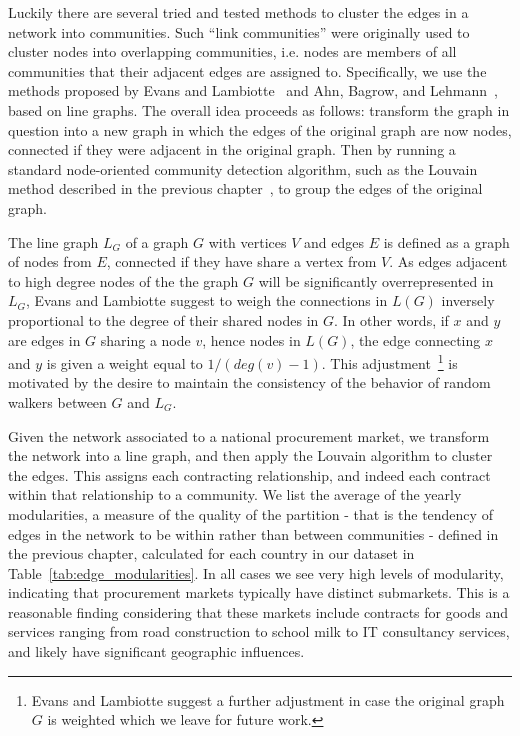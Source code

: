 Luckily there are several tried and tested methods to cluster the edges in a network into communities. Such ``link communities'' were originally used to cluster nodes into overlapping communities, i.e. nodes are members of all communities that their adjacent edges are assigned to. Specifically, we use the methods proposed by Evans and Lambiotte~\cite{evans2009line,evans2010line} and Ahn, Bagrow, and Lehmann~\cite{ahn2010link}, based on line graphs. The overall idea proceeds as follows: transform the graph in question into a new graph in which the edges of the original graph are now nodes, connected if they were adjacent in the original graph. Then by running a standard node-oriented community detection algorithm, such as the Louvain method described in the previous chapter~\cite{blondel2008fast}, to group the edges of the original graph. 

The line graph $L_{G}$ of a graph $G$ with vertices $V$ and edges $E$ is defined as a graph of nodes from $E$, connected if they have share a vertex from $V$. As edges adjacent to high degree nodes of the the graph $G$ will be significantly overrepresented in $L_{G}$, Evans and Lambiotte suggest to weigh the connections in $L(G)$ inversely proportional to the degree of their shared nodes in $G$. In other words, if $x$ and $y$ are edges in $G$ sharing a node $v$, hence nodes in $L(G)$, the edge connecting $x$ and $y$ is given a weight equal to $1/(deg(v)-1)$. This adjustment~\footnote{Evans and Lambiotte suggest a further adjustment in case the original graph $G$ is weighted which we leave for future work.} is motivated by the desire to maintain the consistency of the behavior of random walkers between $G$ and $L_{G}$. 

Given the network associated to a national procurement market, we transform the network into a line graph, and then apply the Louvain algorithm to cluster the edges. This assigns each contracting relationship, and indeed each contract within that relationship to a community. We list the average of the yearly modularities, a measure of the quality of the partition - that is the tendency of edges in the network to be within rather than between communities - defined in the previous chapter, calculated for each country in our dataset in Table~\ref{tab:edge_modularities}. In all cases we see very high levels of modularity, indicating that procurement markets typically have distinct submarkets. This is a reasonable finding considering that these markets include contracts for goods and services ranging from road construction to school milk to IT consultancy services, and likely have significant geographic influences.


